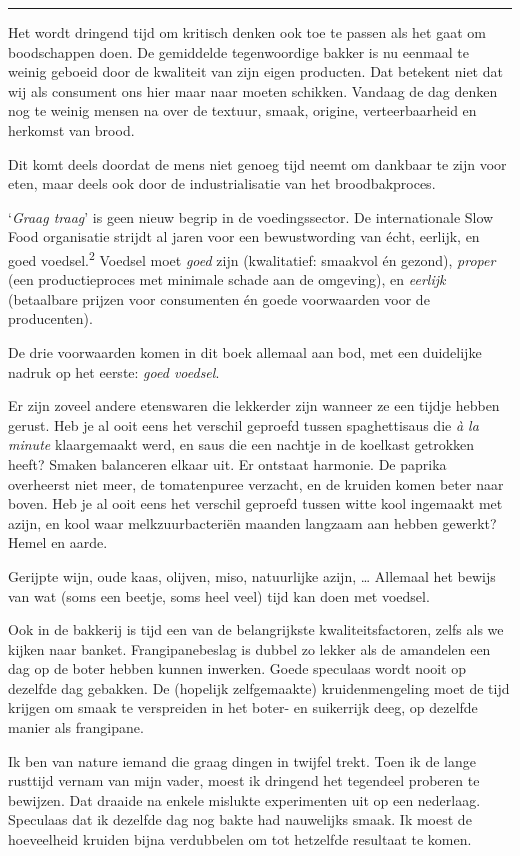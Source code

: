 \documentclass[
  11pt,
  dutch,
]{memoir}
\begin{document}
\pfbreak

Het wordt dringend tijd om kritisch denken ook toe te passen als het
gaat om boodschappen doen. De gemiddelde tegenwoordige bakker is nu
eenmaal te weinig geboeid door de kwaliteit van zijn eigen producten.
Dat betekent niet dat wij als consument ons hier maar naar moeten
schikken. Vandaag de dag denken nog te weinig mensen na over de textuur,
smaak, origine, verteerbaarheid en herkomst van brood.

Dit komt deels doordat de mens niet genoeg tijd neemt om dankbaar te
zijn voor eten, maar deels ook door de industrialisatie van het
broodbakproces.

`\emph{Graag traag}' is geen nieuw begrip in de voedingssector. De
internationale Slow Food organisatie strijdt al jaren voor een
bewustwording van écht, eerlijk, en goed voedsel.\textsuperscript{2}
Voedsel moet \emph{goed} zijn (kwalitatief: smaakvol én gezond),
\emph{proper} (een productieproces met minimale schade aan de omgeving),
en \emph{eerlijk} (betaalbare prijzen voor consumenten én goede
voorwaarden voor de producenten).

De drie voorwaarden komen in dit boek allemaal aan bod, met een
duidelijke nadruk op het eerste: \emph{goed voedsel}.

Er zijn zoveel andere etenswaren die lekkerder zijn wanneer ze een
tijdje hebben gerust. Heb je al ooit eens het verschil geproefd tussen
spaghettisaus die \emph{à la minute} klaargemaakt werd, en saus die een
nachtje in de koelkast getrokken heeft? Smaken balanceren elkaar uit. Er
ontstaat harmonie. De paprika overheerst niet meer, de tomatenpuree
verzacht, en de kruiden komen beter naar boven. Heb je al ooit eens het
verschil geproefd tussen witte kool ingemaakt met azijn, en kool waar
melkzuurbacteriën maanden langzaam aan hebben gewerkt? Hemel en aarde.

Gerijpte wijn, oude kaas, olijven, miso, natuurlijke azijn, \ldots{}
Allemaal het bewijs van wat (soms een beetje, soms heel veel) tijd kan
doen met voedsel.

Ook in de bakkerij is tijd een van de belangrijkste kwaliteitsfactoren,
zelfs als we kijken naar banket. Frangipanebeslag is dubbel zo lekker
als de amandelen een dag op de boter hebben kunnen inwerken. Goede
speculaas wordt nooit op dezelfde dag gebakken. De (hopelijk
zelfgemaakte) kruidenmengeling moet de tijd krijgen om smaak te
verspreiden in het boter- en suikerrijk deeg, op dezelfde manier als
frangipane.

Ik ben van nature iemand die graag dingen in twijfel trekt. Toen ik de
lange rusttijd vernam van mijn vader, moest ik dringend het tegendeel
proberen te bewijzen. Dat draaide na enkele mislukte experimenten uit op
een nederlaag. Speculaas dat ik dezelfde dag nog bakte had nauwelijks
smaak. Ik moest de hoeveelheid kruiden bijna verdubbelen om tot
hetzelfde resultaat te komen.
\end{document}
